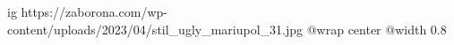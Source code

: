  
 
 
 
 

\ifcmt
  ig https://zaborona.com/wp-content/uploads/2023/04/stil_ugly_mariupol_31.jpg
  @wrap center
  @width 0.8
\fi
